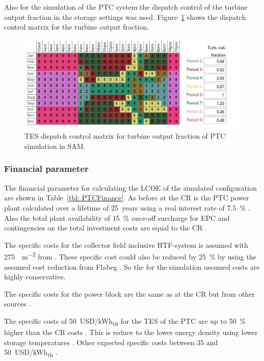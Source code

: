Also for the simulation of the PTC system the dispatch control of the turbine output fraction in the storage settings was used. Figure~\ref{PTC_turbineoutput} shows the dispatch control matrix for the turbine output fraction.
\begin{figure}[htbp]  
\centering
\includegraphics[width=0.95\linewidth]{FIG/PTC_turbineoutput}
\caption[TES dispatch control matrix for turbine output fraction of PTC simulation in SAM.]{TES dispatch control matrix for turbine output fraction of PTC simulation in SAM.}\label{PTC_turbineoutput}
\end{figure}
\subsubsection{Financial parameter}
The financial parameter for calculating the LCOE of the simulated configuration are shown in Table~\ref{tbl: PTCFinance}. As before at the CR is the PTC power plant calculated over a lifetime of \SI{25}{years} using a real interest rate of 7.5~\% \cite{FraunhoferISE2013}. Also the total plant availability of  15~\% once-off surcharge for EPC and contingencies on the total investment costs are equal to the CR \cite{Platzer2014}.



The specific costs for the collector field inclusive HTF-system is assumed with \SI{275}{\usd\per\square\metre} from \cite{Morin2012}. These specific cost could also be reduced by 25~\% by using the assumed cost reduction from Flabeg \cite{FLABEG_FE_GmbH2015}. So the for the simulation assumed costs are highly conservative.


The specific costs for the power block are the same as at the CR but from other sources \cite{Platzer2014}. 

The specific costs of \SI{50}{USD/kWh}\textsubscript{th} for the TES of the PTC are up to 50~\% higher than the CR costs \cite{Platzer2014}. This is reduce to the lower energy density using lower storage temperatures \cite{Steinmann2015}. Other expected specific costs between 35 and \SI{50}{USD/kWh}\textsubscript{th} \cite{Steinmann2012}.

